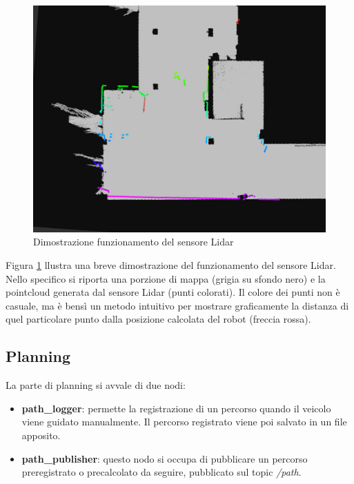 \begin{figure}[h]
  \centering
  \includegraphics[width=1\textwidth]{figures/lidar_map.png}
  \caption{Dimostrazione funzionamento del sensore Lidar}
  \label{funzionamento_particle_filter}
\end{figure}

\noindent Figura \ref{funzionamento_particle_filter} llustra una breve dimostrazione del funzionamento del sensore Lidar. Nello specifico si riporta una porzione di mappa (grigia su sfondo nero) e la pointcloud generata dal sensore Lidar (punti colorati). Il colore dei punti non è casuale, ma è bensì un metodo intuitivo per mostrare graficamente la distanza di quel particolare punto dalla posizione calcolata del robot (freccia rossa).

\subsection{Planning}
\noindent La parte di planning si avvale di due nodi:

\begin{itemize}
  \item \textbf{path\_logger}: permette la registrazione di un percorso quando il veicolo viene guidato manualmente. Il percorso registrato viene poi salvato in un file apposito.
  \item \textbf{path\_publisher}: questo nodo si occupa di pubblicare un percorso preregistrato o precalcolato da seguire, pubblicato sul topic \textit{/path}.  
\end{itemize}

